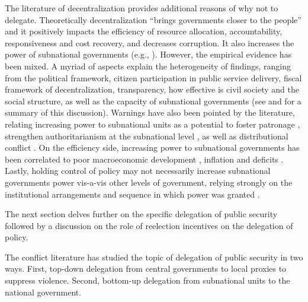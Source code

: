 \documentclass[12pt]{amsart}
\makeatletter
\def\subsection{\@startsection{subsection}{2}
	\z@{.8\linespacing\@plus.7\linespacing}{.7\linespacing}{\large}}
\numberwithin{equation}{section}
\theoremstyle{definition}
\theoremstyle{definition}
\theoremstyle{definition}
\makeatother
\begin{document}
The literature of decentralization provides additional reasons of why not to delegate. Theoretically decentralization ``brings governments closer to the people'' and it positively impacts the efficiency of resource allocation, accountability, responsiveness and cost recovery, and decreases corruption. It also increases the power of subnational governments (e.g., \citet{diamond_1999}). However, the empirical evidence has been mixed. A myriad of aspects explain the heterogeneity of findings, ranging from the political framework, citizen participation in public service delivery, fiscal framework of decentralization, transparency, how effective is civil society and the social structure, as well as the capacity of subnational governments (see \citet{azfar_etal_1999} and \citet{falleti_2005} for a summary of this discussion). Warnings have also been pointed by the literature, relating increasing power to subnational units as a potential to foster patronage \citep{samuels_2003}, strengthen authoritarianism at the subnational level \citep{cornelius_1999}, as well as distributional conflict \citep{treisman_1999}. On the efficiency side, increasing power to subnational governments has been correlated to poor macroeconomic development \citep{wibbels_2000}, inflation\citep{treisman_2000b} and deficits \citep{rodden_2002}. Lastly, holding control of policy may not necessarily increase subnational governments power vis-a-vis other levels of government, relying strongly on the institutional arrangements and sequence in which power was granted \citep{falleti_2005}.  
         
 The next section delves further on the specific delegation of public security followed by a discussion on the role of reelection incentives on the delegation of policy.

     
\subsection{Delegation of Security Policy}%

The conflict literature has studied the topic of delegation of public security in two ways. First, top-down delegation from central governments to local proxies to suppress violence. Second, bottom-up delegation from subnational units to the national government. 
\end{document}
